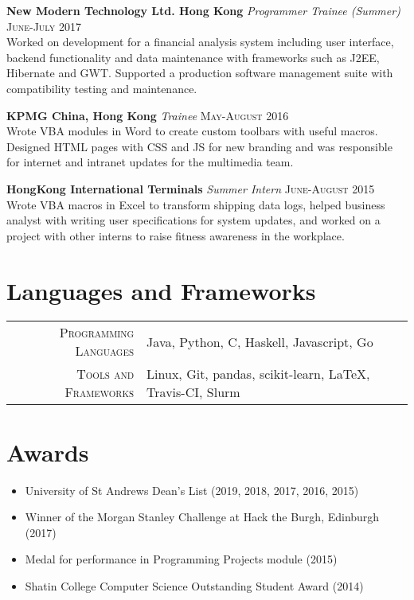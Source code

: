 \documentclass{article}
\begin{document}
\textbf{New Modern Technology Ltd. Hong Kong} \textit{Programmer Trainee (Summer)}
\hfill
\textsc{June-July 2017} \\
Worked on development for a financial analysis system including user interface,
backend functionality and data maintenance with frameworks such as J2EE, Hibernate and GWT.
Supported a production software management suite with compatibility testing and maintenance.
\newline

\textbf{KPMG China, Hong Kong} \textit{Trainee}
\hfill
\textsc{May-August 2016} \\
Wrote VBA modules in Word to create custom toolbars with useful macros.
Designed HTML pages with CSS and JS for new branding and was responsible for
internet and intranet updates for the multimedia team.
\newline

\textbf{HongKong International Terminals} \textit{Summer Intern}
\hfill
\textsc{June-August 2015} \\
Wrote VBA macros in Excel to transform shipping data logs, helped business analyst
with writing user specifications for system updates, and worked on a project with other
interns to raise fitness awareness in the workplace.


\section*{Languages and Frameworks}
\begin{tabular}{r|p{15cm}}
\textsc{Programming Languages} & Java, Python, C, Haskell, Javascript, Go\\

\textsc{Tools and Frameworks} & Linux, Git, pandas, scikit-learn, \LaTeX, Travis-CI, Slurm %
\end{tabular}

\section*{Awards}
\setlength\multicolsep{0pt}
\begin{multicols}{2}
\begin{itemize}
\item University of St Andrews Dean's List (2019, 2018, 2017, 2016, 2015)
\item Winner of the Morgan Stanley Challenge at Hack the Burgh, Edinburgh (2017)
\end{itemize}
\columnbreak
\begin{itemize}
\item Medal for performance in Programming Projects module (2015)
\item Shatin College Computer Science Outstanding Student Award (2014)
\end{itemize}
\end{multicols}
\end{document}
